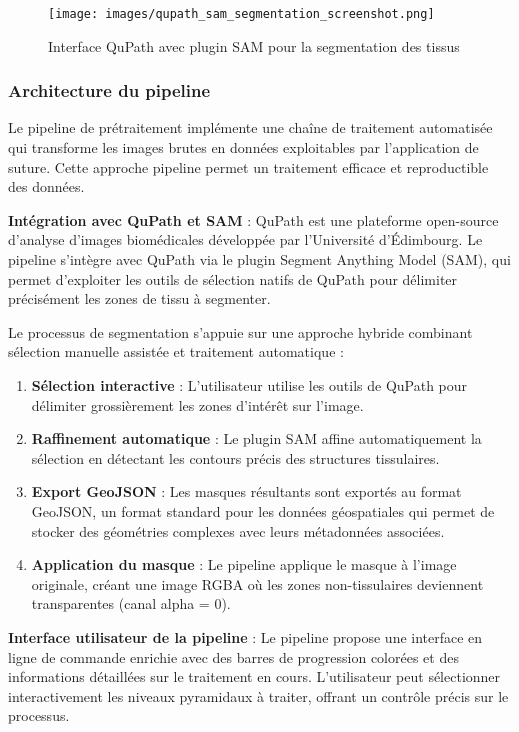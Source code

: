 \documentclass[12pt,a4paper]{report}
\begin{document}
\begin{figure}[H]
\centering
\texttt{[image: images/qupath\_sam\_segmentation\_screenshot.png]}
\caption{Interface QuPath avec plugin SAM pour la segmentation des tissus}
\label{fig:qupath_sam}
\end{figure}

\subsubsection{Architecture du pipeline}

Le pipeline de prétraitement implémente une chaîne de traitement automatisée qui transforme les images brutes en données exploitables par l'application de suture. Cette approche pipeline permet un traitement efficace et reproductible des données.

\textbf{Intégration avec QuPath et SAM} : QuPath est une plateforme open-source d'analyse d'images biomédicales développée par l'Université d'Édimbourg. Le pipeline s'intègre avec QuPath via le plugin Segment Anything Model (SAM), qui permet d'exploiter les outils de sélection natifs de QuPath pour délimiter précisément les zones de tissu à segmenter.

Le processus de segmentation s'appuie sur une approche hybride combinant sélection manuelle assistée et traitement automatique :

\begin{enumerate}
\item \textbf{Sélection interactive} : L'utilisateur utilise les outils de QuPath pour délimiter grossièrement les zones d'intérêt sur l'image.
\item \textbf{Raffinement automatique} : Le plugin SAM affine automatiquement la sélection en détectant les contours précis des structures tissulaires.
\item \textbf{Export GeoJSON} : Les masques résultants sont exportés au format GeoJSON, un format standard pour les données géospatiales qui permet de stocker des géométries complexes avec leurs métadonnées associées.
\item \textbf{Application du masque} : Le pipeline applique le masque à l'image originale, créant une image RGBA où les zones non-tissulaires deviennent transparentes (canal alpha = 0).
\end{enumerate}

\textbf{Interface utilisateur de la pipeline} : Le pipeline propose une interface en ligne de commande enrichie avec des barres de progression colorées et des informations détaillées sur le traitement en cours. L'utilisateur peut sélectionner interactivement les niveaux pyramidaux à traiter, offrant un contrôle précis sur le processus.
\end{document}
